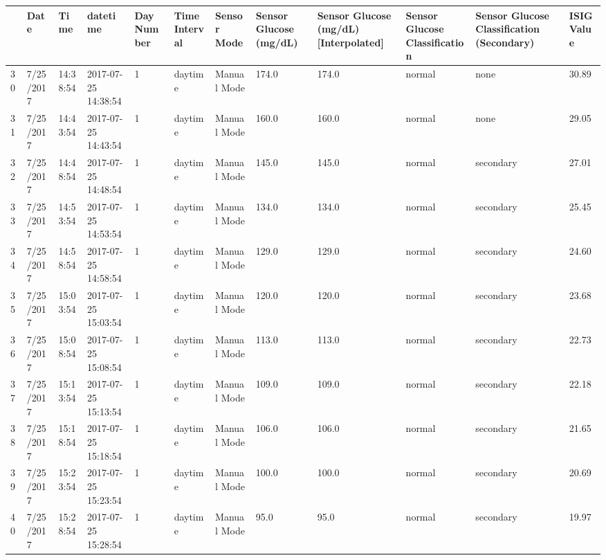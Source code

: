 \bigskip\noindent
\begin{tabular}{p{}p{}p{}p{}p{}p{}p{}p{}p{}p{}p{}p{}}
\toprule
 & Date & Time & datetime & Day Number & Time Interval & Sensor Mode & Sensor Glucose (mg/dL) & Sensor Glucose (mg/dL) [Interpolated] & Sensor Glucose Classification & Sensor Glucose Classification (Secondary) & ISIG Value \\
\hline
30 & 7/25/2017 & 14:38:54 & 2017-07-25 14:38:54 & 1 & daytime & Manual Mode & 174.0 & 174.0 & normal & none & 30.89 \\
\hline
31 & 7/25/2017 & 14:43:54 & 2017-07-25 14:43:54 & 1 & daytime & Manual Mode & 160.0 & 160.0 & normal & none & 29.05 \\
\hline
32 & 7/25/2017 & 14:48:54 & 2017-07-25 14:48:54 & 1 & daytime & Manual Mode & 145.0 & 145.0 & normal & secondary & 27.01 \\
\hline
33 & 7/25/2017 & 14:53:54 & 2017-07-25 14:53:54 & 1 & daytime & Manual Mode & 134.0 & 134.0 & normal & secondary & 25.45 \\
\hline
34 & 7/25/2017 & 14:58:54 & 2017-07-25 14:58:54 & 1 & daytime & Manual Mode & 129.0 & 129.0 & normal & secondary & 24.60 \\
\hline
35 & 7/25/2017 & 15:03:54 & 2017-07-25 15:03:54 & 1 & daytime & Manual Mode & 120.0 & 120.0 & normal & secondary & 23.68 \\
\hline
36 & 7/25/2017 & 15:08:54 & 2017-07-25 15:08:54 & 1 & daytime & Manual Mode & 113.0 & 113.0 & normal & secondary & 22.73 \\
\hline
37 & 7/25/2017 & 15:13:54 & 2017-07-25 15:13:54 & 1 & daytime & Manual Mode & 109.0 & 109.0 & normal & secondary & 22.18 \\
\hline
38 & 7/25/2017 & 15:18:54 & 2017-07-25 15:18:54 & 1 & daytime & Manual Mode & 106.0 & 106.0 & normal & secondary & 21.65 \\
\hline
39 & 7/25/2017 & 15:23:54 & 2017-07-25 15:23:54 & 1 & daytime & Manual Mode & 100.0 & 100.0 & normal & secondary & 20.69 \\
\hline
40 & 7/25/2017 & 15:28:54 & 2017-07-25 15:28:54 & 1 & daytime & Manual Mode & 95.0 & 95.0 & normal & secondary & 19.97 \\

\end{tabular}
